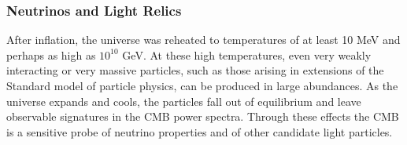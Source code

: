 %
\vspace{-0.15in}

\subsubsection{Neutrinos and Light Relics}

\vspace{-0.05in}

After inflation, the universe was reheated to temperatures of at least 10 MeV and perhaps as high as $10^{10}$ GeV.  
At these high temperatures, even very weakly interacting or very massive particles, such as those arising 
in extensions of the Standard model of particle physics, can be produced in large abundances.  As the universe expands and cools, 
the particles fall out of equilibrium and leave observable signatures in the \ac{CMB} power spectra. 
Through these effects the CMB is a sensitive probe of neutrino properties and of other 
candidate light particles.  

